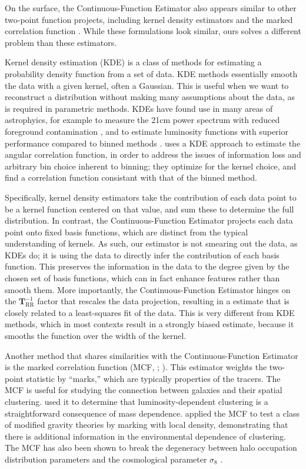 \documentclass[modern]{aastex62}
\newcommand{\est}{the Continuous-Function Estimator\xspace}
\newcommand{\inv}{^{-1}}
\newcommand{\bld}[1]{\bm{#1}}
\newcommand{\TT}[1]{\bld{T}_\mathrm{#1}}
\begin{document}
On the surface, \est also appears similar to other two-point function projects, including kernel density estimators \citep {Hatfield2016} and the marked correlation function \citep{Beisbart2000}.
While these formulations look similar, ours solves a different problem than these estimators.

Kernel density estimation (KDE) is a class of methods for estimating a probability density function from a set of data.
KDE methods essentially smooth the data with a given kernel, often a Gaussian.
This is useful when we want to reconstruct a distribution without making many assumptions about the data, as is required in parametric methods.
KDEs have found use in many areas of astrophyics, for example to measure the 21cm power spectrum with reduced foreground contamination \citep{Trott2019}, and to estimate luminosity functions with superior performance compared to binned methods \citep{Yuan2020}.
\cite{Hatfield2016} uses a KDE approach to estimate the angular correlation function, in order to address the issues of information loss and arbitrary bin choice inherent to binning; they optimize for the kernel choice, and find a correlation function consistant with that of the binned method.

Specifically, kernel density estimators take the contribution of each data point to be a kernel function centered on that value, and sum these to determine the full distribution.
In contrast, \est projects each data point onto fixed basis functions, which are distinct from the typical understanding of kernels.
As such, our estimator is not smearing out the data, as KDEs do; it is using the data to directly infer the contribution of each basis function.
This preserves the information in the data to the degree given by the chosen set of basis functions, which can in fact enhance features rather than smooth them.
More importantly, \est hinges on the $\TT{RR}\inv$ factor that rescales the data projection, resulting in a estimate that is closely related to a least-squares fit of the data.
This is very different from KDE methods, which in most contexts result in a strongly biased estimate, because it smooths the function over the width of the kernel.

Another method that shares similarities with \est is the marked correlation function (MCF, \citealt{Beisbart2000}; \citealt{Sheth2005}).
This estimator weights the two-point statistic by ``marks,'' which are typically properties of the tracers.
The MCF is useful for studying the connection between galaxies and their spatial clustering.
\cite{Skibba2006} used it to determine that luminosity-dependent clustering is a straightforward consequence of mass dependence.
\cite{Armijo2018} applied the MCF to test a class of modified gravity theories by marking with local density, demonstrating that there is additional information in the environmental dependence of clustering.
The MCF has also been shown to break the degeneracy between halo occupation distribution parameters and the cosmological parameter $\sigma_8$ \citep{WhitePadmanabhan2009}.
\end{document}
